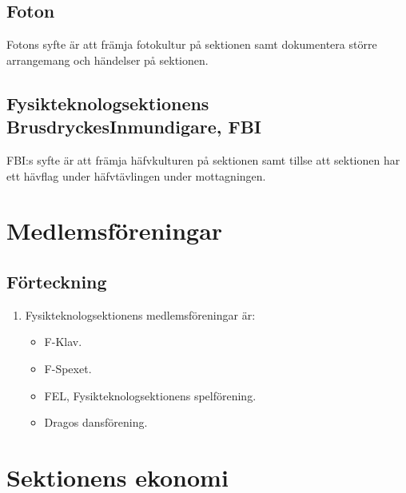 \documentclass[11pt,a4paper]{article}
\begin{document}
    \subsection{Foton}
    Fotons syfte är att främja fotokultur på sektionen samt dokumentera större arrangemang och händelser på sektionen.
    

\subsection{Fysikteknologsektionens BrusdryckesInmundigare, FBI}
FBI:s syfte är att främja häfvkulturen på sektionen samt tillse att sektionen har ett hävflag under häfvtävlingen under mottagningen. 


\newpage

\section{Medlemsföreningar}

\subsection{Förteckning}

\begin{enumerate}[\thesubsection .1]

  \item Fysikteknologsektionens medlemsföreningar är:
    \begin{itemize}
      \item F-Klav.
      \item F-Spexet.
      \item FEL, Fysikteknologsektionens spelförening.
	  \item Dragos dansförening.
    \end{itemize}

\end{enumerate}

\newpage

\section{Sektionens ekonomi}
\end{document}
